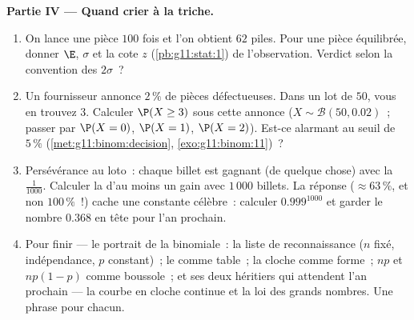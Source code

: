 \begin{problem}
\medskip
\noindent\textbf{Partie IV --- Quand crier à la triche.}
\begin{enumerate}[resume]
  \item On lance une pièce $100$ fois et l'on obtient $62$ piles.
        Pour une pièce équilibrée, donner $\E$, $\sigma$ et la cote
        $z$ (\cref{pb:g11:stat:1}) de l'observation. Verdict selon
        la convention des $2\sigma$~?
  \item Un fournisseur annonce $2\,\%$ de pièces défectueuses. Dans
        un lot de $50$, vous en trouvez $3$. Calculer
        $\P(X \geq 3)$ sous cette annonce
        ($X \sim \mathcal B(50, 0.02)$~; passer par $\P(X = 0)$,
        $\P(X = 1)$, $\P(X = 2)$). Est-ce alarmant au seuil de
        $5\,\%$ (\cref{met:g11:binom:decision},
        \cref{exo:g11:binom:11})~?
  \item Persévérance au loto~: chaque billet est gagnant (de quelque
        chose) avec la  $\frac{1}{1000}$. Calculer la
         d'au moins un gain avec $1\,000$ billets. La
        réponse ($\approx 63\,\%$, et non $100\,\%$~!) cache une
        constante célèbre~: calculer $0.999^{1000}$ et garder le
        nombre $0.368$ en tête pour l'an prochain.
  \item Pour finir --- le portrait de la binomiale~: la liste de
        reconnaissance ($n$ fixé, indépendance, $p$ constant)~; le
         comme table~; la cloche comme forme~;
        $np$ et $np(1-p)$ comme boussole~; et ses deux héritiers qui
        attendent l'an prochain --- la courbe en cloche continue et
        la loi des grands nombres. Une phrase pour chacun.
\end{enumerate}
\end{problem}
